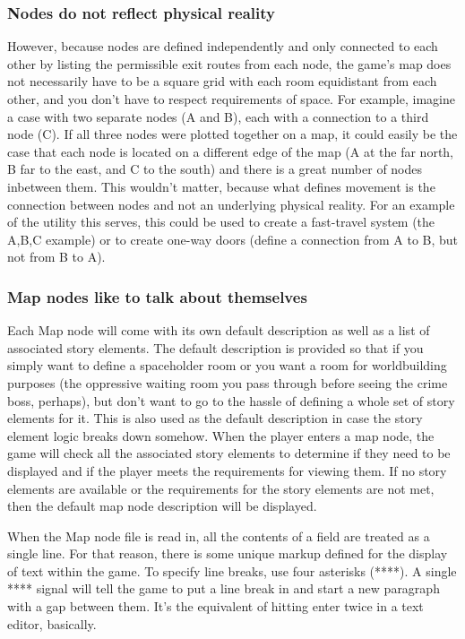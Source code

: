 \documentclass[11pt]{article}
\begin{document}
\subsubsection{Nodes do not reflect physical reality}
However, because nodes are defined independently and only connected to each other by listing the permissible exit routes from each node, the game's map does not necessarily have to be a square grid with each room equidistant from each other, and you don't have to respect requirements of space.
For example, imagine a case with two separate nodes (A and B), each with a connection to a third node (C).
If all three nodes were plotted together on a map, it could easily be the case that each node is located on a different edge of the map (A at the far north, B far to the east, and C to the south) and there is a great number of nodes inbetween them.
This wouldn't matter, because what defines movement is the connection between nodes and not an underlying physical reality.
For an example of the utility this serves, this could be used to create a fast-travel system (the A,B,C example) or to create one-way doors (define a connection from A to B, but not from B to A).

\subsubsection{Map nodes like to talk about themselves}
Each Map node will come with its own default description as well as a list of associated story elements.
The default description is provided so that if you simply want to define a spaceholder room or you want a room for worldbuilding purposes (the oppressive waiting room you pass through before seeing the crime boss, perhaps), but don't want to go to the hassle of defining a whole set of story elements for it.
This is also used as the default description in case the story element logic breaks down somehow.
When the player enters a map node, the game will check all the associated story elements to determine if they need to be displayed and if the player meets the requirements for viewing them.
If no story elements are available or the requirements for the story elements are not met, then the default map node description will be displayed.

When the Map node file is read in, all the contents of a field are treated as a single line.
For that reason, there is some unique markup defined for the display of text within the game.
To specify line breaks, use four asterisks (****).
A single **** signal will tell the game to put a line break in and start a new paragraph with a gap between them.
It's the equivalent of hitting enter twice in a text editor, basically.
\end{document}
